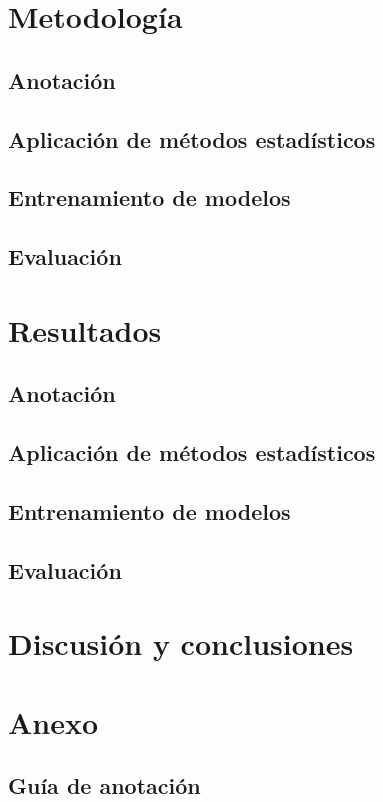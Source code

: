 \documentclass[colorinlistoftodos]{article}
\begin{document}
\section{Metodolog\'ia}
\subsection{Anotación}

\subsection{Aplicación de m\'etodos estad\'isticos}

\subsection{Entrenamiento de modelos}

\subsection{Evaluaci\'on}


\section{Resultados}
\subsection{Anotación}\label{subsec-results-annotation}

\subsection{Aplicación de m\'etodos estad\'isticos}

\subsection{Entrenamiento de modelos}

\subsection{Evaluaci\'on}


\section{Discusi\'on y conclusiones}




\clearpage
\appendix
\section{Anexo}
\subsection{Guía de anotación}\label{appendix-annotation}


\listoftodos%
\end{document}
